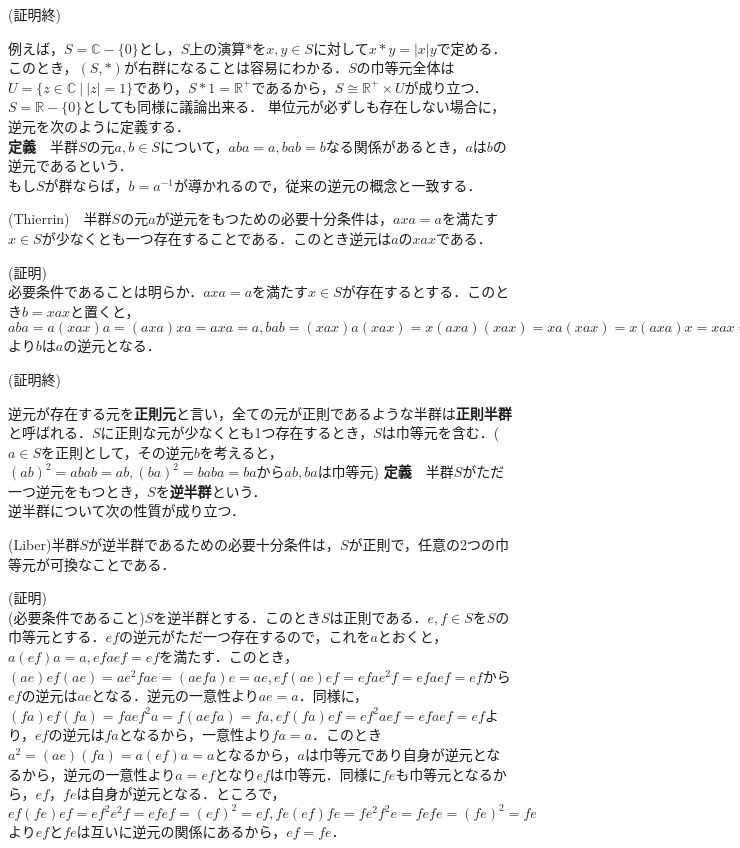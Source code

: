 \begin{flushright}
(証明終)
\end{flushright}
例えば，$S={\mathbb C}-\{0\}$とし，$S$上の演算$*$を$x,y\in S$に対して$x*y=|x|y$で定める．このとき，$(S,*)$が右群になることは容易にわかる．$S$の巾等元全体は$U=\{z\in{\mathbb C}\:|\:|z|=1\}$であり，$S*1={\mathbb R^+}$であるから，$S\cong {\mathbb R^+}\times U$が成り立つ．$S={\mathbb R}-\{0\}$としても同様に議論出来る．
単位元が必ずしも存在しない場合に，逆元を次のように定義する．\\
{\bf 定義}　半群$S$の元$a,b\in S$について，$aba=a,bab=b$なる関係があるとき，$a$は$b$の逆元であるという．\\
もし$S$が群ならば，$b=a^{-1}$が導かれるので，従来の逆元の概念と一致する．
\begin{sprop}
(Thierrin)　半群$S$の元$a$が逆元をもつための必要十分条件は，$axa=a$を満たす$x\in S$が少なくとも一つ存在することである．このとき逆元は$a$の$xax$である．
\end{sprop}
(証明)\\
必要条件であることは明らか．$axa=a$を満たす$x\in S$が存在するとする．このとき$b=xax$と置くと，$aba=a(xax)a=(axa)xa=axa=a, bab=(xax)a(xax)=x(axa)(xax)=xa(xax)=x(axa)x=xax=b$より$b$は$a$の逆元となる．
\begin{flushright}
(証明終)
\end{flushright}
逆元が存在する元を{\bf 正則元}と言い，全ての元が正則であるような半群は{\bf 正則半群}と呼ばれる．$S$に正則な元が少なくとも1つ存在するとき，$S$は巾等元を含む．($a\in S$を正則として，その逆元$b$を考えると，$(ab)^2=abab=ab, (ba)^2=baba=ba$から$ab,ba$は巾等元)
{\bf 定義}　半群$S$がただ一つ逆元をもつとき，$S$を{\bf 逆半群}という．\\
逆半群について次の性質が成り立つ．
\begin{sthm}
(Liber)半群$S$が逆半群であるための必要十分条件は，$S$が正則で，任意の2つの巾等元が可換なことである．
\end{sthm}
(証明)\\
(必要条件であること)$S$を逆半群とする．このとき$S$は正則である．$e,f\in S$を$S$の巾等元とする．$ef$の逆元がただ一つ存在するので，これを$a$とおくと，$a(ef)a=a,efaef=ef$を満たす．このとき，$(ae)ef(ae)=ae^2fae=(aefa)e=ae,ef(ae)ef=efae^2f=efaef=ef$から$ef$の逆元は$ae$となる．逆元の一意性より$ae=a$．同様に，$(fa)ef(fa)=faef^2a=f(aefa)=fa,ef(fa)ef=ef^2aef=efaef=ef$より，$ef$の逆元は$fa$となるから，一意性より$fa=a$．このとき$a^2=(ae)(fa)=a(ef)a=a$となるから，$a$は巾等元であり自身が逆元となるから，逆元の一意性より$a=ef$となり$ef$は巾等元．同様に$fe$も巾等元となるから，$ef$，$fe$は自身が逆元となる．ところで，$ef(fe)ef=ef^2e^2f=efef=(ef)^2=ef,fe(ef)fe=fe^2f^2e=fefe=(fe)^2=fe$より$ef$と$fe$は互いに逆元の関係にあるから，$ef=fe$．\\
